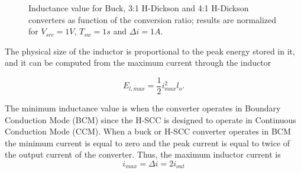 \begin{SCfigure}
\centering
{}
\caption{Inductance value for Buck, 3:1 H-Dickson and 4:1 H-Dickson converters as function of the conversion ratio; results are normalized  for $V_{src} = 1V$, $T_{sw}=1s$ and $\Delta i = 1A$.}
\label{fig:inductor_size}
\end{SCfigure}

The physical size of the inductor is proportional to the peak energy stored in it, and it can be computed from the maximum current through the inductor

\begin{equation}
 E_{l,max}  = \frac{1}{2} i_{max}^2 l_{o}.
\label{eq:eng_L}
\end{equation}

The minimum inductance value is when the converter operates in Boundary Conduction Mode (BCM) since the H-SCC is designed to operate in Continuous Conduction Mode (CCM). When a buck or H-SCC converter operates in BCM the minimum current is equal to zero and the peak current is equal to twice of the output current of the converter. Thus, the maximum inductor current is
\begin{equation}
 i_{max} = \Delta i  = 2 i_{out}
\label{eq:i_max}
\end{equation}

